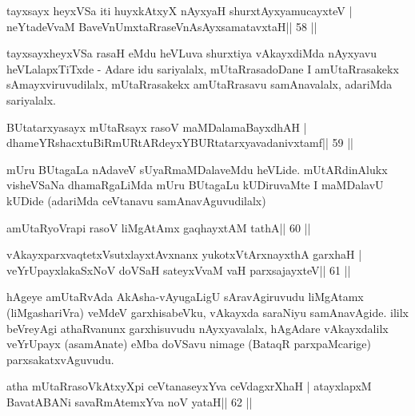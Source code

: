 \begin{shl}
tayxsayx heyxVSa iti huyxkAtxyX nAyxyaH shurxtAyx\s yamucayxteV |
neYtadeVvaM BaveVnUmxtaRraseVnAsAyxsamatavxtaH\hfill || 58 ||
\end{shl}

\begin{artha}
tayxsayxheyxVSa rasaH eMdu heVLuva shurxtiya vAkayxdiMda nAyxyavu heVLalapxTiTxde - Adare idu sariyalalx, mUtaRrasadoDane I amUtaRrasakekx sAmayxviruvudilalx, mUtaRrasakekx amUtaRrasavu samAnavalalx, adariMda sariyalalx.
\end{artha}



\begin{shl}
BUtatarxyasayx mUtaRsayx rasoV maMDalamaBayxdhAH |
dhameYRshacxtuBiRmURtARdeyxYBURtatarxyavadanivxtamf\hfill || 59 ||
\end{shl}

\begin{artha}
mUru BUtagaLa nAdaveV sUyaRmaMDalaveMdu heVLide. mUtARdinAlukx
visheVSaNa dhamaRgaLiMda mUru BUtagaLu kUDiruvaMte I maMDalavU kUDide
(adariMda ceVtanavu samAnavAguvudilalx)
\end{artha}

\begin{shl}
\footnotemark[1]amUtaRyoVrapi rasoV liMgAtAmx gaqhayxtAM tathA\hfill || 60 ||
\end{shl}

\begin{shl}
vAkayxparxvaqtetxVsutxlayxtAvxnanx yukotxV\s tArxnayxthA garxhaH |
veYrUpayxlakaSxNoV doVSaH sateyxVvaM vaH parxsajayxteV\hfill || 61 ||
\end{shl}

\begin{artha}
hAgeye amUtaRvAda AkAsha-vAyugaLigU sAravAgiruvudu liMgAtamx (liMgashariVra) veMdeV garxhisabeVku, vAkayxda saraNiyu samAnavAgide. ililx beVreyAgi athaRvanunx garxhisuvudu nAyxyavalalx, hAgAdare vAkayxdalilx veYrUpayx (asamAnate) eMba doVSavu nimage (BataqR parxpaMcarige) parxsakatxvAguvudu.
\end{artha}



\begin{shl}
atha mUtaRrasoVkAtxyX\s pi ceVtanaseyxYva ceVdagxrXhaH |
atayxlapxM BavatA\s BANi savaRmAtemxYva noV yataH\hfill || 62 ||
\end{shl}

